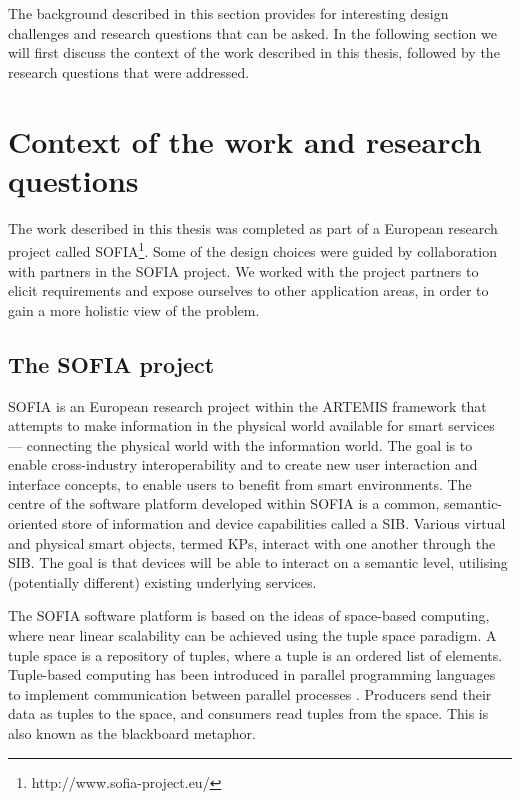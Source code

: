 The background described in this section provides for interesting design challenges and research questions that can be asked. In the following section we will first discuss the context of the work described in this thesis, followed by the research questions that were addressed.







\section{Context of the work and research questions}

The work described in this thesis was completed as part of a European research project called \ac{SOFIA}\footnote{http://www.sofia-project.eu/}. Some of the design choices were guided by collaboration with partners in the \ac{SOFIA} project. We worked with the project partners to elicit requirements and expose ourselves to other application areas, in order to gain a more holistic view of the problem.


\subsection{The SOFIA project}\label{sofia}

\ac{SOFIA} is an European research project within the ARTEMIS framework that attempts to make information in the physical world available for smart services --- connecting the physical world with the information world. The goal is to enable cross-industry interoperability and to create new user interaction and interface concepts, to enable users to benefit from smart environments. The centre of the software platform developed within \ac{SOFIA} is a common, semantic-oriented store of information and device capabilities called a \ac{SIB}. Various virtual and physical smart objects, termed \acp{KP}, interact with one another through the \ac{SIB}. The goal is that devices will be able to interact on a semantic level, utilising (potentially different) existing underlying services.

\label{sofiatuple}
The \ac{SOFIA} software platform is based on the ideas of space-based computing, where near linear scalability can be achieved using the tuple space paradigm. A tuple space is a repository of tuples, where a tuple is an ordered list of elements. Tuple-based computing has been introduced in parallel programming languages to implement communication between parallel processes \cite{Fensel2004}. Producers send their data as tuples to the space, and consumers read tuples from the space. This is also known as the blackboard metaphor.

